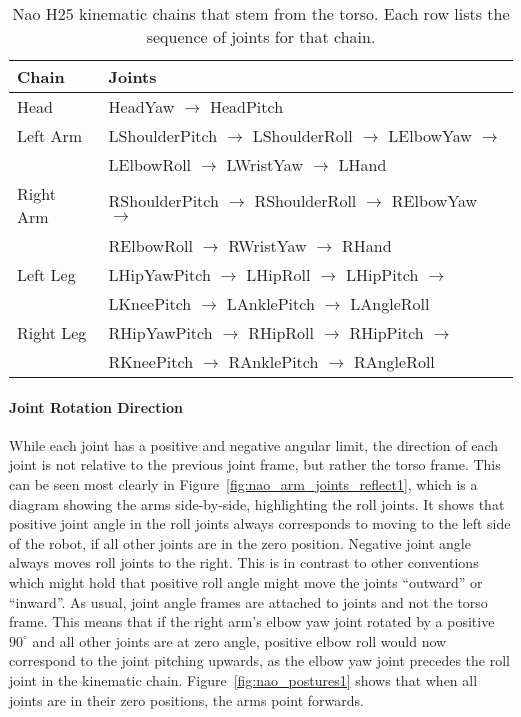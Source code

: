 \begin{table}
\centering
\begin{tabulary}{\textwidth}{|l||l|}
\hline
\textbf{Chain}& \textbf{Joints}\\	\hline\hline
Head	   & HeadYaw $\rightarrow$ HeadPitch    \\	\hline
Left Arm   & LShoulderPitch $\rightarrow$ LShoulderRoll $\rightarrow$ LElbowYaw $\rightarrow$ \\
           & LElbowRoll $\rightarrow$ LWristYaw   $\rightarrow$ LHand       \\	\hline
Right Arm  & RShoulderPitch $\rightarrow$ RShoulderRoll $\rightarrow$ RElbowYaw $\rightarrow$ \\
           & RElbowRoll $\rightarrow$ RWristYaw   $\rightarrow$ RHand       \\	\hline
Left Leg   & LHipYawPitch   $\rightarrow$ LHipRoll      $\rightarrow$ LHipPitch $\rightarrow$ \\
           & LKneePitch $\rightarrow$ LAnklePitch $\rightarrow$ LAngleRoll  \\	\hline 
Right Leg  & RHipYawPitch   $\rightarrow$ RHipRoll      $\rightarrow$ RHipPitch $\rightarrow$ \\ 
           & RKneePitch $\rightarrow$ RAnklePitch $\rightarrow$ RAngleRoll  \\	\hline 
\end{tabulary} 
\caption{Nao H25 kinematic chains that stem from the torso.
         Each row lists the sequence of joints for that chain.}
\label{tab:joint_chains}
\end{table}

\FloatBarrier

\paragraph{Joint Rotation Direction}
While each joint has a positive and negative angular limit, the direction
of each joint is not relative to the previous joint frame, but rather the
torso frame. This can be seen most clearly in Figure~\ref{fig:nao_arm_joints_reflect1},
which is a diagram showing the arms side-by-side, highlighting the roll joints.
It shows that positive joint angle in the roll joints always corresponds to moving to the
left side of the robot, if all other joints are in the zero position.
Negative joint angle always moves roll joints to the right. This is in contrast
to other conventions which might hold that positive roll angle might move
the joints ``outward'' or ``inward''.
As usual, joint angle frames are attached to joints and not the torso frame.
This means that if the right arm's elbow yaw joint rotated by a positive
$90^\circ$ and all other joints are at zero angle, positive elbow roll
would now correspond to the joint pitching upwards, as the elbow yaw joint
precedes the roll joint in the kinematic chain. Figure~\ref{fig:nao_postures1}
shows that when all joints are in their zero positions, the arms point forwards.

